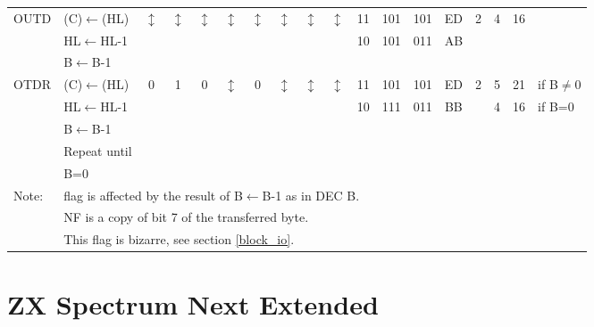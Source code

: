 \documentclass[oneside,a4paper]{book}
\newcommand{\instrt}{\rule{0pt}{2.7ex}}
\newcommand{\instrb}{\rule[-1.7ex]{0pt}{0pt}}
\newcommand{\notet}{\rule{0pt}{2.4ex}}
\newcommand{\noteb}{\rule[-1.3ex]{0pt}{0pt}}
\begin{document}
{\begin{tabular}{llcccccccccccccccl}
		OUTD\instrt & 
			(C)$\leftarrow$(HL) & 
			$\updownarrow$\footnotemark[1] & 
				$\updownarrow$\footnotemark[1] & 
				$\updownarrow$\footnotemark[1] & 
				$\updownarrow$\footnotemark[3] & 
				$\updownarrow$\footnotemark[1] & 
				$\updownarrow$\footnotemark[3] & 
				$\updownarrow$\footnotemark[2] & 
				$\updownarrow$\footnotemark[3] & 
			11 & 101 & 101 & 
			ED & 2 & 
			4 & 16 & \\
			& HL$\leftarrow$HL-1 & \multicolumn{8}{c}{} & 10 & 101 & 011 & AB & \\
			& B$\leftarrow$B-1 & \instrb \\

		OTDR\instrt & 
			(C)$\leftarrow$(HL) & 
			0 & 
				1 & 
				0 & 
				$\updownarrow$\footnotemark[3] & 
				0 & 
				$\updownarrow$\footnotemark[3] & 
				$\updownarrow$\footnotemark[2] & 
				$\updownarrow$\footnotemark[5] & 
			11 & 101 & 101 & 
			ED & 2 & 
			5 & 21 & {if B$\not=$0} \\
			& HL$\leftarrow$HL-1 & \multicolumn{8}{c}{} & 10 & 111 & 011 & BB & & 4 & 16 & {if B=0} \\
			& B$\leftarrow$B-1 \\
			& Repeat until \\
			& B=0 & \instrb \\
			
		\hline

		Note:
			& \multicolumn{17}{l}{\parbox{12cm}{\footnotemark[1] flag is affected by the result of B$\leftarrow$B-1 as in DEC B.}}\notet \\

			& \multicolumn{17}{l}{\parbox{12cm}{\footnotemark[2] NF is a copy of bit 7 of the transferred byte.}} \\

			& \multicolumn{17}{l}{\parbox{12cm}{\footnotemark[3] This flag is bizarre, see section \ref{block_io}.}}\noteb \\
			
		\hline

	\end{tabular}
}


\section{ZX Spectrum Next Extended}
\label{zx_next_instructions_table}
\end{document}
